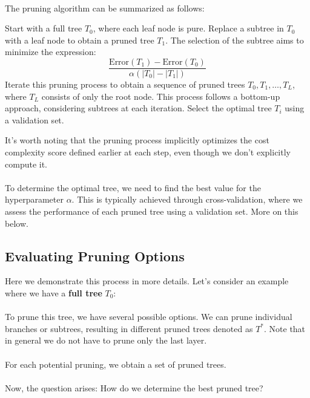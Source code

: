 \documentclass[11pt,a4paper]{report}
\begin{document}
\paragraph{}The pruning algorithm can be summarized as follows:
\begin{algorithm}[H]
\begin{algorithmic}[1]
   \State Start with a full tree $T_0$, where each leaf node is pure.
   \State Replace a subtree in $T_0$ with a leaf node to obtain a pruned tree $T_1$. The selection of the subtree aims to minimize the expression:\newline $$\frac{\textrm{Error}(T_1)-\textrm{Error}(T_0)}{\alpha(|T_0|-|T_1|)}$$
	\State Iterate this pruning process to obtain a sequence of pruned trees $T_0, T_1,\dots, T_L$, where $T_L$ consists of only the root node. This process follows a bottom-up approach, considering subtrees at each iteration.
	\State Select the optimal tree $T_i$ using a validation set.
\end{algorithmic}
\end{algorithm}
It's worth noting that the pruning process implicitly optimizes the cost complexity score defined earlier at each step, even though we don't explicitly compute it.
\paragraph{}To determine the optimal tree, we need to find the best value for the hyperparameter $\alpha$. This is typically achieved through cross-validation, where we assess the performance of each pruned tree using a validation set. More on this below. 
\subsection{Evaluating Pruning Options}Here we demonstrate this process in more details. Let's consider an example where we have a \textbf{full tree} $T_0$:\\
\\
To prune this tree, we have several possible options. We can prune individual branches or subtrees, resulting in different pruned trees denoted as $T^*$. Note that in general we do not have to prune only the last layer.\\
\\
For each potential pruning, we obtain a set of pruned trees.\\
\\
Now, the question arises: How do we determine the best pruned tree?
\end{document}

